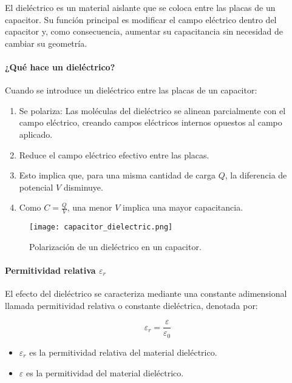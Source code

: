 El dieléctrico es un material aislante que se coloca entre las placas de un capacitor. Su función principal es modificar el campo eléctrico dentro del capacitor y, como consecuencia, aumentar su capacitancia sin necesidad de cambiar su geometría.

\paragraph{¿Qué hace un dieléctrico?}

Cuando se introduce un dieléctrico entre las placas de un capacitor:
\begin{enumerate}
    \item Se polariza: Las moléculas del dieléctrico se alinean parcialmente con el campo eléctrico, creando campos eléctricos internos opuestos al campo aplicado.
    \item Reduce el campo eléctrico efectivo entre las placas.
    \item Esto implica que, para una misma cantidad de carga \( Q \), la diferencia de potencial \( V \) disminuye.
    \item Como \( C = \frac{Q}{V} \), una menor \( V \) implica una mayor capacitancia.
\end{enumerate}

\begin{figure}[ht]
    \centering
    \texttt{[image: capacitor\_dielectric.png]}
    \caption{Polarización de un dieléctrico en un capacitor.}
    \label{fig:capacitor_dieletrico}
\end{figure}

\paragraph{Permitividad relativa \( \varepsilon_r \)}

El efecto del dieléctrico se caracteriza mediante una constante adimensional llamada permitividad relativa o constante dieléctrica, denotada por:

\[
\varepsilon_r = \frac{\varepsilon}{\varepsilon_0}
\]

\begin{itemize}
    \item \( \varepsilon_r \) es la permitividad relativa del material dieléctrico.
    \item \( \varepsilon \) es la permitividad del material dieléctrico.
\end{itemize}

